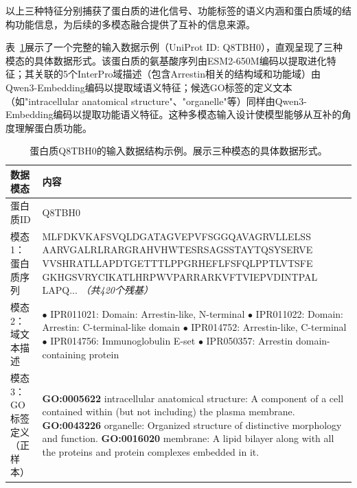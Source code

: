 以上三种特征分别捕获了蛋白质的进化信号、功能标签的语义内涵和蛋白质域的结构功能信息，为后续的多模态融合提供了互补的信息来源。

表~\ref{tab:mzsgo_example_data}展示了一个完整的输入数据示例（UniProt ID: Q8TBH0），直观呈现了三种模态的具体数据形式。该蛋白质的氨基酸序列由ESM2-650M编码以提取进化特征；其关联的5个InterPro域描述（包含Arrestin相关的结构域和功能域）由Qwen3-Embedding编码以提取域语义特征；候选GO标签的定义文本（如"intracellular anatomical structure"、"organelle"等）同样由Qwen3-Embedding编码以提取功能语义特征。这种多模态输入设计使模型能够从互补的角度理解蛋白质功能。

\begin{table}[htbp]
    \centering
    \caption{蛋白质Q8TBH0的输入数据结构示例。展示三种模态的具体数据形式。}
    \label{tab:mzsgo_example_data}
    \small
    \begin{tabular}{p{2.2cm} p{11cm}}
        \toprule
        \textbf{数据模态} & \textbf{内容} \\
        \midrule
        蛋白质ID & Q8TBH0 \\
        \midrule
        模态1：蛋白质序列 & MLFDKVKAFSVQLDGATAGVEPVFSGGQAVAGRVLLELSS AARVGALRLRARGRAHVHWTESRSAGSSTAYTQSYSERVE VVSHRATLLAPDTGETTTLPPGRHEFLFSFQLPPTLVTSFE GKHGSVRYCIKATLHRPWVPARRARKVFTVIEPVDINTPAL LAPQ... \textit{（共420个残基）} \\
        \midrule
        模态2：域文本描述 & $\bullet$ IPR011021: Domain: Arrestin-like, N-terminal \newline
        $\bullet$ IPR011022: Domain: Arrestin: C-terminal-like domain \newline
        $\bullet$ IPR014752: Arrestin-like, C-terminal \newline
        $\bullet$ IPR014756: Immunoglobulin E-set \newline
        $\bullet$ IPR050357: Arrestin domain-containing protein \\
        \midrule
        模态3：GO标签定义（正样本） & \textbf{GO:0005622} intracellular anatomical structure: A component of a cell contained within (but not including) the plasma membrane. \newline
        \textbf{GO:0043226} organelle: Organized structure of distinctive morphology and function. \newline
        \textbf{GO:0016020} membrane: A lipid bilayer along with all the proteins and protein complexes embedded in it. \\
        \bottomrule
    \end{tabular}
\end{table}

